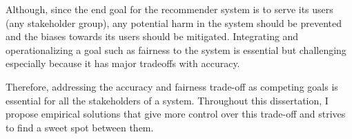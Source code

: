 Although, since the end goal for the recommender system is to serve its users (any stakeholder group), any potential harm in the system should be prevented and the biases towards its users should be mitigated. Integrating and operationalizing a goal such as fairness to the system is essential but challenging especially because it has major tradeoffs with accuracy.








Therefore, addressing the accuracy and fairness trade-off as competing goals is essential for all the stakeholders of a system. Throughout this dissertation, I propose empirical solutions that give more control over this trade-off and strives to find a sweet spot between them. 


